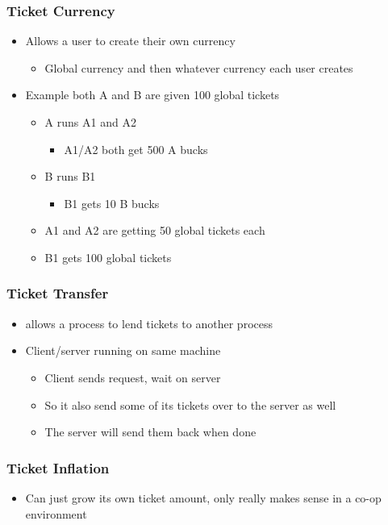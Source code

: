 \documentclass[11pt]{article}
\begin{document}
\subsubsection{Ticket Currency}
\label{sec:org4f7d4cf}
\begin{itemize}
\item Allows a user to create their own currency
\begin{itemize}
\item Global currency and then whatever currency each user creates
\end{itemize}

\item Example both A and B are given 100 global tickets
\begin{itemize}
\item A runs A1 and A2
\begin{itemize}
\item A1/A2 both get 500 A bucks
\end{itemize}
\item B runs B1
\begin{itemize}
\item B1 gets 10 B bucks
\end{itemize}

\item A1 and A2 are getting 50 global tickets each
\item B1 gets 100 global tickets
\end{itemize}
\end{itemize}
\subsubsection{Ticket Transfer}
\label{sec:orga4ade9d}
\begin{itemize}
\item allows a process to lend tickets to another process
\item Client/server running on same machine
\begin{itemize}
\item Client sends request, wait on server
\item So it also send some of its tickets over to the server as well
\item The server will send them back when done
\end{itemize}
\end{itemize}
\subsubsection{Ticket Inflation}
\label{sec:orgad68ec6}
\begin{itemize}
\item Can just grow its own ticket amount, only really makes sense in a co-op environment
\end{itemize}
\end{document}
